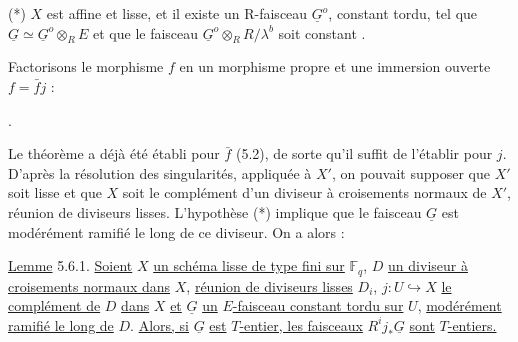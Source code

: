 (*)  $X$ est affine et lisse, et il existe un R-faisceau $\underline{G}^o$, constant tordu, tel que $\underline{G} \simeq \underline{G}^o \otimes_R E$ et que le faisceau $\underline{G}^o \otimes_R R/\lambda^b$ soit constant .

Factorisons le morphisme $f$ en un morphisme propre et une immersion ouverte $f = \bar{f} j$ :

\begin{center}
\end{center}
.

Le théorème a déjà été établi pour $\bar{f}$ (5.2), de sorte qu'il suffit de l'établir pour $j$. D'après la résolution des singularités, appliquée à $X'$, on pouvait supposer que $X'$ soit lisse et que $X$ soit le complément d'un diviseur à croisements normaux de $X'$, réunion de diviseurs lisses. L'hypothèse (*) implique que le faisceau $\underline{G}$ est modérément ramifié le long de ce diviseur. On a alors :



\underline{Lemme} 5.6.1. \underline{Soient} $X$ \underline{un schéma lisse de type fini sur} $\mathbb{F}_q$, $D$ \underline{un diviseur à croisements normaux dans} $X$, \underline{réunion de diviseurs lisses} $D_i$, $j : U \hookrightarrow X$ \underline{le complément de} $D$ \underline{dans} $X$ \underline{et} $\underline{G}$ \underline{un} $E$\underline{-faisceau constant tordu sur} $U$, \underline{modérément ramifié le long de} $D$. \underline{Alors, si} $\underline{G}$ \underline{est} $T$\underline{-entier, les faisceaux} $R^i j_*\underline{G}$ \underline{sont} $T$\underline{-entiers.}

